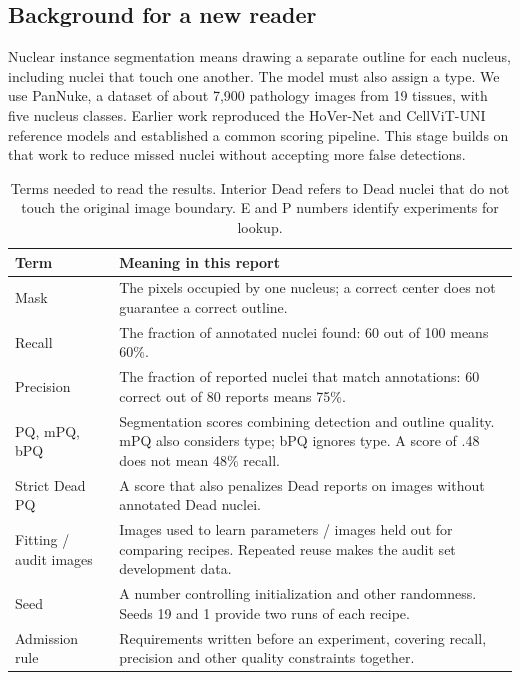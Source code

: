 \documentclass[11pt,a4paper]{article}
\begin{document}
\subsection{Background for a new reader}

Nuclear instance segmentation means drawing a separate outline for each nucleus, including nuclei that touch one another. The model must also assign a type. We use PanNuke, a dataset of about 7,900 pathology images from 19 tissues, with five nucleus classes. Earlier work reproduced the HoVer-Net and CellViT-UNI reference models and established a common scoring pipeline. This stage builds on that work to reduce missed nuclei without accepting more false detections.

\begin{table}[H]\centering\small
\begin{tabularx}{\linewidth}{p{30mm}X}\toprule
Term & Meaning in this report\\\midrule
Mask & The pixels occupied by one nucleus; a correct center does not guarantee a correct outline.\\
Recall & The fraction of annotated nuclei found: 60 out of 100 means 60\%.\\
Precision & The fraction of reported nuclei that match annotations: 60 correct out of 80 reports means 75\%.\\
PQ, mPQ, bPQ & Segmentation scores combining detection and outline quality. mPQ also considers type; bPQ ignores type. A score of .48 does not mean 48\% recall.\\
Strict Dead PQ & A score that also penalizes Dead reports on images without annotated Dead nuclei.\\
Fitting / audit images & Images used to learn parameters / images held out for comparing recipes. Repeated reuse makes the audit set development data.\\
Seed & A number controlling initialization and other randomness. Seeds 19 and 1 provide two runs of each recipe.\\
Admission rule & Requirements written before an experiment, covering recall, precision and other quality constraints together.\\\bottomrule
\end{tabularx}
\caption{Terms needed to read the results. Interior Dead refers to Dead nuclei that do not touch the original image boundary. E and P numbers identify experiments for lookup.}
\end{table}
\end{document}
